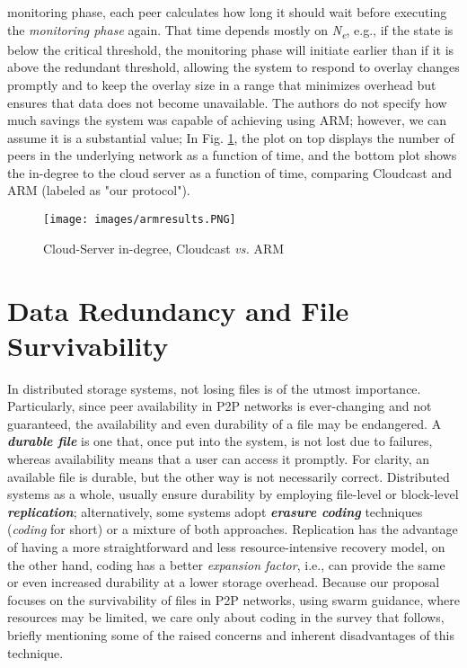 \documentclass[runningheads]{llncs}
\begin{document}
monitoring phase, each peer calculates how long it should wait before executing the \textit{monitoring phase} again. That time depends mostly on \textit{N\textsubscript{e}}, e.g., if the state is below the critical threshold, the monitoring phase will initiate earlier than if it is above the redundant threshold, allowing the system to respond to overlay changes promptly and to keep the overlay size in a range that minimizes overhead but ensures that data does not become unavailable. The authors do not specify how much savings the system was capable of achieving using ARM; however, we can assume it is a substantial value; In Fig. \ref{fig:arm_results}, the plot on top displays the number of peers in the underlying network as a function of time, and the bottom plot shows the in-degree to the cloud server as a function of time, comparing Cloudcast and ARM (labeled as "our protocol").

\begin{figure}[!ht]
\centering
\texttt{[image: images/armresults.PNG]}
\caption{Cloud-Server in-degree, Cloudcast \textit{vs.} ARM \cite{marriage_of_convinience}}
\label{fig:arm_results}
\end{figure}

\newpage\section{Data Redundancy and File Survivability}\label{sec:dataredundancy}
In distributed storage systems, not losing files is of the utmost importance. Particularly, since peer availability in P2P networks is ever-changing and not guaranteed, the availability and even durability of a file may be endangered. A \textbf{\textit{durable file}} is one that, once put into the system, is not lost due to failures, whereas availability means that a user can access it promptly. For clarity, an available file is durable, but the other way is not necessarily correct. Distributed systems as a whole, usually ensure durability by employing file-level or block-level \textbf{\textit{replication}}; alternatively, some systems adopt \textbf{\textit{erasure coding}} techniques (\textit{coding} for short) or a mixture of both approaches. Replication has the advantage of having a more straightforward and less resource-intensive recovery model, on the other hand, coding has a better \textit{expansion factor}, i.e., can provide the same or even increased durability at a lower storage overhead. Because our proposal focuses on the survivability of files in P2P networks, using swarm guidance, where resources may be limited, we care only about coding in the survey that follows, briefly mentioning some of the raised concerns and inherent disadvantages of this technique.
\end{document}
